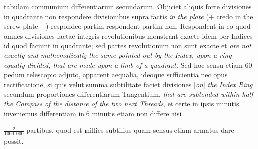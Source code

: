 tabulam communium differentiarum secundarum. Objiciet aliquis forte divisiones  in quadrante\protect{} non respondere divisionibus supra factis \textit{in the plate} (+ credo in the screw plate +) respondeo partim respondent partim non. Respondent in eo quod omnes divisiones factae integris revolutionibus monstrant exacte idem per Indices id quod faciunt in quadrante\protect{}; sed partes revolutionum non sunt exacte et  \textit{are not exactly and mathematically the same pointed out by the Index, upon a ring equally divided, that are made upon a limb of a quadrant\protect{}.} Sed hoc sensu etiam 60 pedum telescopio\protect{} adjuto, apparent aequalia, ideoque sufficientia nec opus rectificatione, si quis velut summa subtilitate faciet divisiones [\textit{on}] \textit{the Index Ring} secundum proportiones differentiarum Tangentium, \textit{that are subtended within half the Compass of the distance of the two next Threads}, et certe in ipsis minutis inveniemus differentiam in 6 minutis etiam non differe nisi \rule[-4mm]{0mm}{10mm}$\displaystyle\frac{2}{1000,000}$ partibus, quod est millies subtilius quam sensus etiam armatus dare possit. 
\pend 
\vspace{1mm}
\count{}
\count{}
\count{} 
\pstart